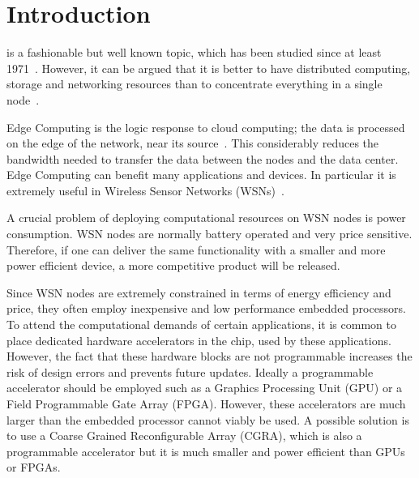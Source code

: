 \documentclass[journal]{IEEEtran}
\begin{document}
\section{Introduction}
% 
% 
% 
% 

 is a fashionable but well known
topic, which has been studied since at least
1971~\cite{white1971network}. However, it can be argued that it is
better to have distributed computing, storage and networking resources
than to concentrate everything in a single
node~\cite{armbrust2010view}.

Edge Computing is the logic response to cloud computing; the data is
processed on the edge of the network, near its
source~\cite{gaber2014pocket}. This considerably reduces the bandwidth
needed to transfer the data between the nodes and the data
center. Edge Computing can benefit many applications and devices. In
particular it is extremely useful in Wireless Sensor Networks
(WSNs)~\cite{beckman2016waggle}.

A crucial problem of deploying computational resources on WSN nodes is
power consumption. WSN nodes are normally battery operated and very
price sensitive. Therefore, if one can deliver the same functionality
with a smaller and more power efficient device, a more competitive
product will be released.

Since WSN nodes are extremely constrained in terms of energy
efficiency and price, they often employ inexpensive and low
performance embedded processors. To attend the computational demands
of certain applications, it is common to place dedicated hardware
accelerators in the chip, used by these applications. However, the
fact that these hardware blocks are not programmable increases the
risk of design errors and prevents future updates. Ideally a
programmable accelerator should be employed such as a Graphics
Processing Unit (GPU) or a Field Programmable Gate Array
(FPGA). However, these accelerators are much larger than the embedded
processor cannot viably be used. A possible solution is to use a
Coarse Grained Reconfigurable Array (CGRA), which is also a
programmable accelerator but it is much smaller and power efficient
than GPUs or FPGAs.
\end{document}

